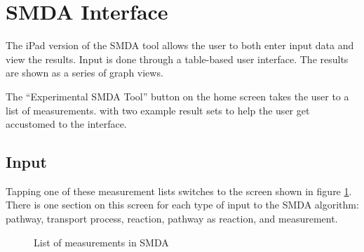 \section{SMDA Interface}
\label{sect:smda_interface}

The iPad version of the SMDA tool allows the user to both enter input data and
view the results. Input is done through a table-based user interface. The
results are shown as a series of graph views.

The ``Experimental SMDA Tool'' button on the home screen takes the user to a
list of measurements. \mawapp with two example result sets to help the user get
accustomed to the interface.

\subsection{Input}
\label{sect:smda_interface_input}

Tapping one of these measurement lists switches to the screen shown in figure
\ref{fig:screenshot_smda_list}. There is one section on this screen for each
type of input to the SMDA algorithm: pathway, transport process, reaction,
pathway as reaction, and measurement.

\begin{figure}[htb]
    \caption{\label{fig:screenshot_smda_list} List of measurements in SMDA}
\end{figure}

